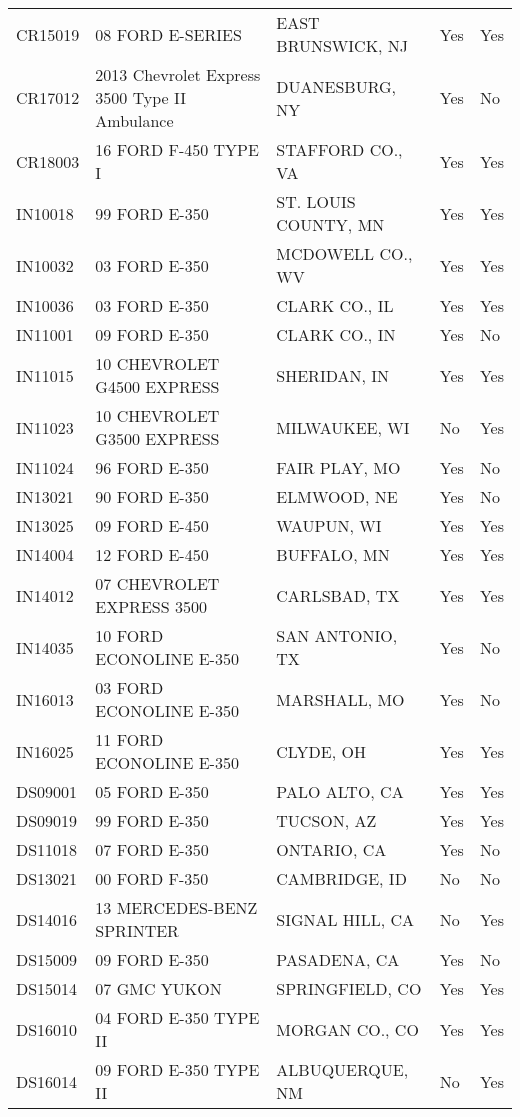 \begin{appendices}
\begin{table}[]
\begin{tabular}{lllll}
CR15019 & 08 FORD E-SERIES & EAST BRUNSWICK, NJ & Yes & Yes \\
CR17012 & 2013 Chevrolet   Express 3500 Type II Ambulance & DUANESBURG, NY & Yes & No \\
CR18003 & 16 FORD F-450 TYPE I & STAFFORD CO., VA & Yes & Yes \\
IN10018 & 99 FORD E-350 & ST. LOUIS COUNTY, MN & Yes & Yes \\
IN10032 & 03 FORD E-350 & MCDOWELL CO., WV & Yes & Yes \\
IN10036 & 03 FORD E-350 & CLARK CO., IL & Yes & Yes \\
IN11001 & 09 FORD E-350 & CLARK CO., IN & Yes & No \\
IN11015 & 10 CHEVROLET G4500   EXPRESS & SHERIDAN, IN & Yes & Yes \\
IN11023 & 10 CHEVROLET G3500   EXPRESS & MILWAUKEE, WI & No & Yes \\
IN11024 & 96 FORD E-350 & FAIR PLAY, MO & Yes & No \\
IN13021 & 90 FORD E-350 & ELMWOOD, NE & Yes & No \\
IN13025 & 09 FORD E-450 & WAUPUN, WI & Yes & Yes \\
IN14004 & 12 FORD E-450 & BUFFALO, MN & Yes & Yes \\
IN14012 & 07 CHEVROLET EXPRESS   3500 & CARLSBAD, TX & Yes & Yes \\
IN14035 & 10 FORD ECONOLINE   E-350 & SAN ANTONIO, TX & Yes & No \\
IN16013 & 03 FORD ECONOLINE   E-350 & MARSHALL, MO & Yes & No \\
IN16025 & 11 FORD ECONOLINE   E-350 & CLYDE, OH & Yes & Yes \\
DS09001 & 05 FORD E-350 & PALO ALTO, CA & Yes & Yes \\
DS09019 & 99 FORD E-350 & TUCSON, AZ & Yes & Yes \\
DS11018 & 07 FORD E-350 & ONTARIO, CA & Yes & No \\
DS13021 & 00 FORD F-350 & CAMBRIDGE, ID & No & No \\
DS14016 & 13 MERCEDES-BENZ   SPRINTER & SIGNAL HILL, CA & No & Yes \\
DS15009 & 09 FORD E-350 & PASADENA, CA & Yes & No \\
DS15014 & 07 GMC YUKON & SPRINGFIELD, CO & Yes & Yes \\
DS16010 & 04 FORD E-350 TYPE II & MORGAN CO., CO & Yes & Yes \\
DS16014 & 09 FORD E-350 TYPE II & ALBUQUERQUE, NM & No & Yes
\end{tabular}
\end{table}


\end{appendices}

